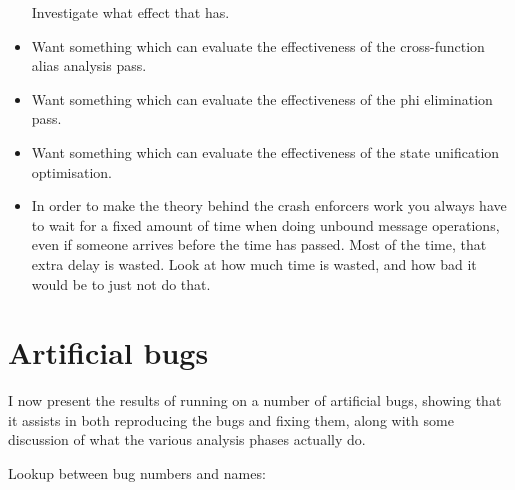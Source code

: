 \begin{itemize}
  Investigate what effect that has.
\item
  Want something which can evaluate the effectiveness of the
  cross-function alias analysis pass.
\item
  Want something which can evaluate the effectiveness of the phi
  elimination pass.
\item
  Want something which can evaluate the effectiveness of the state
  unification optimisation.
\item
  In order to make the theory behind the crash enforcers work you
  always have to wait for a fixed amount of time when doing unbound
  message operations, even if someone arrives before the time has
  passed.  Most of the time, that extra delay is wasted.  Look at how
  much time is wasted, and how bad it would be to just not do that.
\end{itemize}

\section{Artificial bugs}

I now present the results of running {\implementation} on a number of
artificial bugs, showing that it assists in both reproducing the bugs
and fixing them, along with some discussion of what the various
analysis phases actually do.

Lookup between bug numbers and names:

